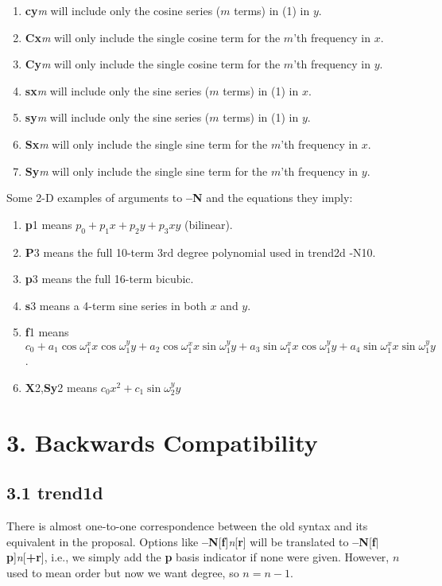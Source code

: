 \documentclass[12pt,letterpaper,margin=0.5in]{report}
\begin{document}
\begin{enumerate}
	\item {\bf cy}{\it m} will include only the cosine series ($m$ terms) in (1) in $y$.
	\item {\bf Cx}{\it m} will only include the single cosine term for the $m$'th frequency in $x$.
	\item {\bf Cy}{\it m} will only include the single cosine term for the $m$'th frequency in $y$.
	\item {\bf sx}{\it m} will include only the sine series ($m$ terms) in (1) in $x$.
	\item {\bf sy}{\it m} will include only the sine series ($m$ terms) in (1) in $y$.
	\item {\bf Sx}{\it m} will only include the single sine term for the $m$'th frequency in $x$.
	\item {\bf Sy}{\it m} will only include the single sine term for the $m$'th frequency in $y$.
\end{enumerate}
Some 2-D examples of arguments to {\bf --N} and the equations they imply:
\begin{enumerate}
	\item {\bf p}1 means $p_0 + p_1 x + p_2 y + p_3xy$ (bilinear).
	\item {\bf P}3 means the full 10-term 3rd degree polynomial used in trend2d -N10.
	\item {\bf p}3 means the full 16-term bicubic.
	\item {\bf s}3 means a 4-term sine series in both $x$ and $y$.
	\item {\bf f}1 means $c_0 + a_1\cos \omega^x_1 x \cos \omega ^y_1 y + a_2\cos \omega^x_1 x \sin \omega ^y_1 y + a_3\sin \omega^x_1 x \cos \omega ^y_1 y + a_4\sin \omega^x_1 x \sin \omega ^y_1 y$.
	\item {\bf X}2,{\bf Sy}2 means $c_0 x^2 + c_1 \sin \omega^y_2 y$
\end{enumerate}

\section*{3. Backwards Compatibility}

\subsection*{3.1 trend1d}
There is almost one-to-one correspondence between the old syntax and its equivalent
in the proposal.  Options like {\bf --N}[{\bf f}]{\it n}[{\bf r}] will be translated to {\bf --N}[{\bf f}$|${\bf p}]{\it n}[{\bf +r}], i.e.,
we simply add the {\bf p} basis indicator if none were given.  However, $n$ used to mean order but now we want degree, so $n = n - 1$.
\end{document}

